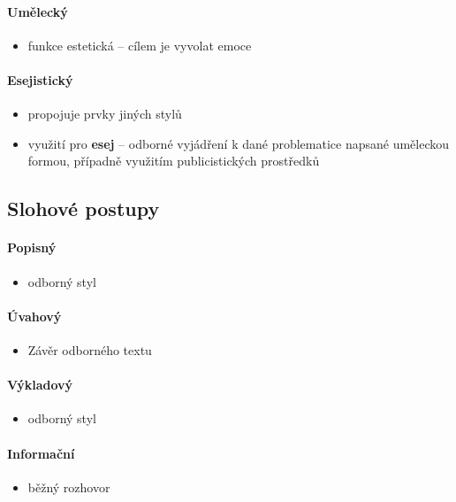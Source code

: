 \paragraph{Umělecký}
\begin{itemize}
\item funkce estetická -- cílem je vyvolat emoce
\end{itemize}

\paragraph{Esejistický}
\begin{itemize}
\item propojuje prvky jiných stylů
\item využití pro \textbf{esej} -- odborné vyjádření k dané problematice napsané uměleckou formou, případně využitím publicistických prostředků
\end{itemize}

\subsection{Slohové postupy}
\paragraph{Popisný}
\begin{itemize}
\item odborný styl
\end{itemize}

\paragraph{Úvahový}
\begin{itemize}
\item Závěr odborného textu
\end{itemize}

\paragraph{Výkladový}
\begin{itemize}
\item odborný styl
\end{itemize}

\paragraph{Informační}
\begin{itemize}
\item běžný rozhovor
\end{itemize}

